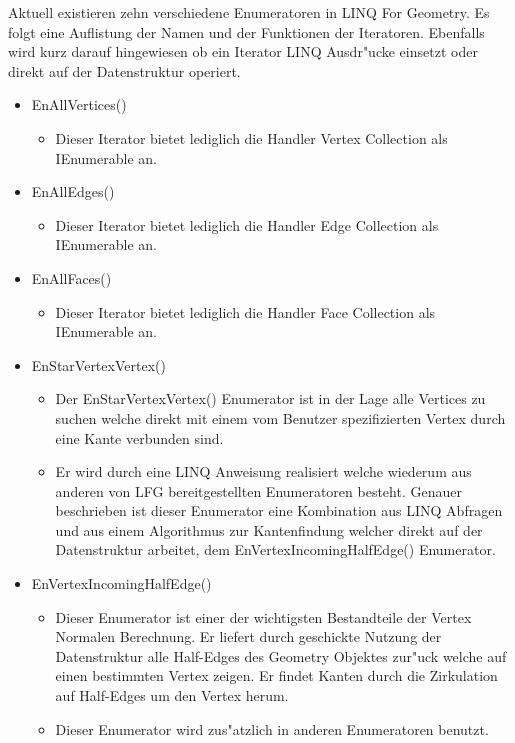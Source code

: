 \documentclass[pagesize, paper=a4, fontsize=12pt,titlepage=true, headings=small, headnosepline, abstractoff, liststotoc, nochapterprefix, plainheadsepline]{scrreprt}
\newcommand{\LFG}{LINQ For Geometry}
\begin{document}
Aktuell existieren zehn verschiedene Enumeratoren in \LFG. Es folgt eine Auflistung der Namen und der Funktionen der Iteratoren. Ebenfalls wird kurz darauf hingewiesen ob ein Iterator LINQ Ausdr"ucke einsetzt oder direkt auf der Datenstruktur operiert.
\begin{itemize}
\item EnAllVertices()
	\begin{itemize}
	\item Dieser Iterator bietet lediglich die Handler Vertex Collection als IEnumerable an.
	\end{itemize}
\item EnAllEdges()
	\begin{itemize}
	\item Dieser Iterator bietet lediglich die Handler Edge Collection als IEnumerable an.
	\end{itemize}
\item EnAllFaces()
	\begin{itemize}
	\item Dieser Iterator bietet lediglich die Handler Face Collection als IEnumerable an.
	\end{itemize}
\item EnStarVertexVertex()
	\begin{itemize}
	\item Der EnStarVertexVertex() Enumerator ist in der Lage alle Vertices zu suchen welche direkt mit einem vom Benutzer spezifizierten Vertex durch eine Kante verbunden sind.
	\item Er wird durch eine LINQ Anweisung realisiert welche wiederum aus anderen von LFG bereitgestellten Enumeratoren besteht. Genauer beschrieben ist dieser Enumerator eine Kombination aus LINQ Abfragen und aus einem Algorithmus zur Kantenfindung welcher direkt auf der Datenstruktur arbeitet, dem EnVertexIncomingHalfEdge() Enumerator.
	\end{itemize}
\item EnVertexIncomingHalfEdge()
	\begin{itemize}
	\item Dieser Enumerator ist einer der wichtigsten Bestandteile der Vertex Normalen Berechnung. Er liefert durch geschickte Nutzung der Datenstruktur alle Half-Edges des Geometry Objektes zur"uck welche auf einen bestimmten Vertex zeigen. Er findet Kanten durch die Zirkulation auf Half-Edges um den Vertex herum.
\item Dieser Enumerator wird zus"atzlich in anderen Enumeratoren benutzt.
	\end{itemize}

\end{itemize}
\end{document}
